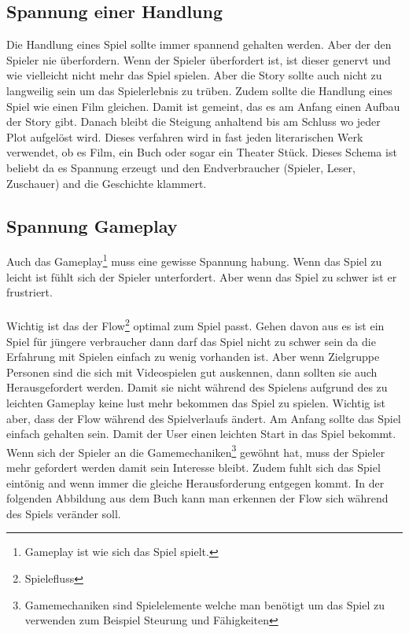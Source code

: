 \subsection{Spannung einer Handlung}
Die Handlung eines Spiel sollte immer spannend gehalten werden. Aber der den Spieler nie überfordern. Wenn der Spieler überfordert ist, ist dieser genervt und wie vielleicht nicht mehr das Spiel spielen. Aber die Story sollte auch nicht zu langweilig sein um das Spielerlebnis zu trüben. Zudem sollte die Handlung eines Spiel wie einen Film gleichen. Damit ist gemeint, das es am Anfang einen Aufbau der Story gibt. Danach bleibt die Steigung anhaltend bis am Schluss wo jeder Plot aufgelöst wird. Dieses verfahren wird in fast jeden literarischen Werk verwendet, ob es Film, ein Buch oder sogar ein Theater Stück. Dieses Schema ist beliebt da es Spannung erzeugt und den Endverbraucher (Spieler, Leser, Zuschauer) and die Geschichte klammert. 

\subsection{Spannung Gameplay}
Auch das Gameplay\footnote[1]{Gameplay ist wie sich das Spiel spielt.} muss eine gewisse Spannung habung. Wenn das Spiel zu leicht ist fühlt sich der Spieler unterfordert. Aber wenn das Spiel zu schwer ist er frustriert.\\\\
Wichtig ist das der Flow\footnote[2]{Spielefluss} optimal zum Spiel passt. Gehen davon aus es ist ein Spiel für jüngere verbraucher dann darf das Spiel nicht zu schwer sein da die Erfahrung mit Spielen einfach zu wenig vorhanden ist. Aber wenn Zielgruppe Personen sind die sich mit Videospielen gut auskennen, dann sollten sie auch Herausgefordert werden. Damit sie nicht während des Spielens aufgrund des zu leichten Gameplay keine lust mehr bekommen das Spiel zu spielen. Wichtig ist aber, dass der Flow während des Spielverlaufs ändert. Am Anfang sollte das Spiel einfach gehalten sein. Damit der User einen leichten Start in das Spiel bekommt. Wenn sich der Spieler an die Gamemechaniken\footnote[3]{Gamemechaniken sind Spielelemente welche man benötigt um das Spiel zu verwenden zum Beispiel Steurung und Fähigkeiten} gewöhnt hat, muss der Spieler mehr gefordert werden damit sein Interesse bleibt. Zudem fuhlt sich das Spiel eintönig and wenn immer die gleiche Herausforderung entgegen kommt. In der folgenden Abbildung aus dem Buch  kann man erkennen der Flow sich während des Spiels veränder soll.


